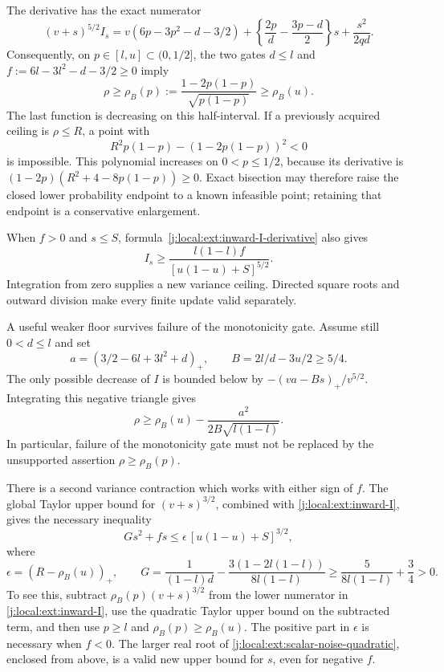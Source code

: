 The derivative has the exact numerator
\begin{equation}\label{j:local:ext:inward-I-derivative}
 (v+s)^{5/2}I_s
 =v(6p-3p^2-d-3/2)
   +\left\{\frac{2p}{d}-\frac{3p-d}{2}\right\}s
   +\frac{s^2}{2qd}.
\end{equation}
Consequently, on $p\in[l,u]\subset(0,1/2]$, the two gates
$d\le l$ and $f:=6l-3l^2-d-3/2\ge0$ imply
\[
 \rho\ge\rho_B(p):=\frac{1-2p(1-p)}{\sqrt{p(1-p)}}
                  \ge\rho_B(u).
\]
The last function is decreasing on this half-interval. If a previously
acquired ceiling is $\rho\le R$, a point with
\[
 R^2p(1-p)-(1-2p(1-p))^2<0
\]
is impossible. This polynomial increases on $0<p\le1/2$, because
its derivative is $(1-2p)(R^2+4-8p(1-p))\ge0$.
Exact bisection may therefore raise the closed lower probability
endpoint to a known infeasible point; retaining that endpoint is a
conservative enlargement.

When $f>0$ and $s\le S$, formula~\eqref{j:local:ext:inward-I-derivative}
also gives
\[
 I_s\ge
 \frac{l(1-l)f}{[u(1-u)+S]^{5/2}}.
\]
Integration from zero supplies a new variance ceiling. Directed square
roots and outward division make every finite update valid separately.

A useful weaker floor survives failure of the monotonicity gate.
Assume still $0<d\le l$ and set
\[
 a=(3/2-6l+3l^2+d)_+,
 \qquad B=2l/d-3u/2\ge5/4.
\]
The only possible decrease of $I$ is bounded below by
$-(va-Bs)_+/v^{5/2}$. Integrating this negative triangle gives
\begin{equation}\label{j:local:ext:inward-deficit}
 \rho\ge\rho_B(u)-\frac{a^2}{2B\sqrt{l(1-l)}}.
\end{equation}
In particular, failure of the monotonicity gate must not be replaced
by the unsupported assertion $\rho\ge\rho_B(p)$.

There is a second variance contraction which works with either sign
of $f$. The global Taylor upper bound for $(v+s)^{3/2}$, combined
with \eqref{j:local:ext:inward-I}, gives the necessary inequality
\begin{equation}\label{j:local:ext:scalar-noise-quadratic}
 Gs^2+fs\le\epsilon\,[u(1-u)+S]^{3/2},
\end{equation}
where
\[
 \epsilon=(R-\rho_B(u))_+,\qquad
 G=\frac1{(1-l)d}-\frac{3(1-2l(1-l))}{8l(1-l)}
       \ge\frac5{8l(1-l)}+\frac34>0.
\]
To see this, subtract $\rho_B(p)(v+s)^{3/2}$ from the lower
numerator in \eqref{j:local:ext:inward-I}, use the quadratic Taylor upper
bound on the subtracted term, and then use $p\ge l$ and
$\rho_B(p)\ge\rho_B(u)$. The positive part in $\epsilon$ is
necessary when $f<0$. The larger real root of
\eqref{j:local:ext:scalar-noise-quadratic}, enclosed from above, is a valid
new upper bound for $s$, even for negative $f$.

